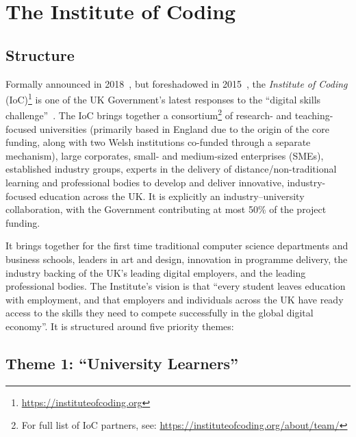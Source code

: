 \documentclass[conference]{IEEEtran}
\begin{document}
\section{The Institute of Coding}\label{ioc}

\subsection{Structure}

Formally announced in 2018~\cite{DfE2018a}, but foreshadowed in
2015~\cite{HMG2015a}, the {\emph{Institute of Coding}}
(IoC)\footnote{\url{https://instituteofcoding.org}} is one of the UK
Government's latest responses to the ``digital skills
challenge''~\cite{davenport-et-al:cep2019}. The IoC brings together a
consortium\footnote{For full list of IoC partners, see:
\url{https://instituteofcoding.org/about/team/}} of research- and
teaching-focused universities (primarily based in England due to the
origin of the core funding, along with two Welsh institutions
co-funded through a separate mechanism), large corporates, small- and
medium-sized enterprises (SMEs), established industry groups, experts
in the delivery of distance/non-traditional learning and professional
bodies to develop and deliver innovative, industry-focused education
across the UK. It is explicitly an industry--university collaboration,
with the Government contributing at most 50\% of the project funding.

It brings together for the first time traditional computer science
departments and business schools, leaders in art and design,
innovation in programme delivery, the industry backing of the UK's
leading digital employers, and the leading professional bodies.  The
Institute's vision is that ``every student leaves education with
employment, and that employers and individuals across the UK have
ready access to the skills they need to compete successfully in the
global digital economy''. It is structured around five priority
themes:

\subsection{Theme 1: ``University Learners''}

\end{document}
